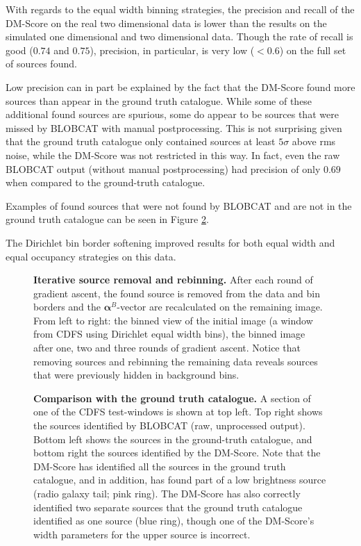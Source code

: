 With regards to the equal width binning strategies, the precision and recall of the DM-Score on the real two dimensional data is lower than the results on the simulated one dimensional and two dimensional data. Though the rate of recall is good ($0.74$ and $0.75$), precision, in particular, is very low ($< 0.6$) on the full set of sources found. 

Low precision can in part be explained by the fact that the DM-Score found more sources than appear in the ground truth catalogue. While some of these additional found sources are spurious, some do appear to be sources that were missed by BLOBCAT with manual postprocessing. This is not surprising given that the ground truth catalogue only contained sources at least $5 \sigma$ above rms noise, while the DM-Score was not restricted in this way. In fact, even the raw BLOBCAT output (without manual postprocessing) had precision of only $0.69$ when compared to the ground-truth catalogue.

Examples of found sources that were not found by BLOBCAT and are not in the ground truth catalogue can be seen in Figure \ref{fig:comps}.

The Dirichlet bin border softening improved results for both equal width and equal occupancy strategies on this data.

\begin{figure}
\centering
{}
\caption[Iterative source removal and rebinning]{\textbf{Iterative source removal and rebinning.} After each round of gradient ascent, the found source is removed from the data and bin borders and the $\boldsymbol{\alpha}^B$-vector are recalculated on the remaining image. From left to right: the binned view of the initial image (a window from CDFS using Dirichlet equal width bins), the binned image after one, two and three rounds of gradient ascent. Notice that removing sources and rebinning the remaining data reveals sources that were previously hidden in background bins.} 
\label{fig:progbinned}
\end{figure}

\begin{figure}
\centering
{}
\caption[Comparison with the ground truth catalogue]{\textbf{Comparison with the ground truth catalogue.} A section of one of the CDFS test-windows is shown at top left. Top right shows the sources identified by BLOBCAT (raw, unprocessed output). Bottom left shows the sources in the ground-truth catalogue, and bottom right the sources identified by the DM-Score. Note that the DM-Score has identified all the sources in the ground truth catalogue, and in addition, has found part of a low brightness source (radio galaxy tail; pink ring). The DM-Score has also correctly identified two separate sources that the ground truth catalogue identified as one source (blue ring), though one of the DM-Score's width parameters for the upper source is incorrect.} 
\label{fig:comps}
\end{figure}


